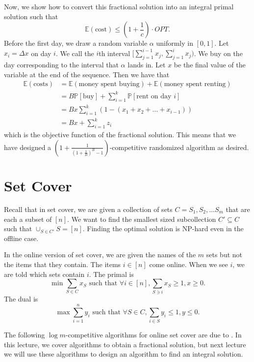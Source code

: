 \documentclass[11pt]{article}
\begin{document}
Now, we show how to convert this fractional solution into an integral primal solution such that
\[\mathbb{E}(\text{cost}) \le \left(1 + \frac{1}{c} \right) \cdot OPT.\]
Before the first day, we draw a random variable $\alpha$ uniformly in $[0,1]$. Let $x_i = \Delta x$ on day $i$. We call the $i$th interval $[\sum_{j=1}^{i-1} x_j, \sum_{j=1}^i x_j)$. We buy on the day corresponding to the interval that $\alpha$ lands in. Let $x$ be the final value of the variable at the end of the sequence.  Then we have that
\begin{align*}
\mathbb{E}(\text{costs}) &= \mathbb{E}(\text{money spent buying}) + \mathbb{E}(\text{money spent renting}) \\
&= B \mathbb{P}[\text{buy}] + \sum_{i=1}^k \mathbb{P}[\text{rent on day $i$}] \\
&= B x \sum_{i=1}^k (1 - (x_1 + x_2 + \ldots + x_{i-1})) \\
&= Bx + \sum_{i=1}^k z_i 
\end{align*}  
which is the objective function of the fractional solution. This means that we have designed a $\left(1 + \frac{1}{(1+\frac{1}{B})^B - 1}\right)$-competitive randomized algorithm as desired.
\section{Set Cover}
Recall that in set cover, we are given a collection of sets $C = S_1, S_2, \ldots S_m$ that are each a subset of $[n]$. We want to find the smallest sized subcollection $C' \subseteq C$ such that $\cup_{S \in C'} S = [n]$. Finding the optimal solution is NP-hard even in the offline case. 

In the online version of set cover, we are given the names of the $m$ sets but not the items that they contain. The items $i \in [n]$ come online. When we see $i$, we are told which sets contain $i$. The primal is
\[\min \sum_{S \in C} x_S \text{ such that } \forall i \in [n], \sum_{S \ni i} x_S \ge 1, x \ge 0.\] The dual is
\[\max \sum_{i=1}^n y_i \text{ such that } \forall S \in C, \sum_{i \in S} y_i \le 1, y \le 0.\] 

The following $\log m$-competitive algorithms for online set cover are due to \cite{setcover}. In this lecture, we cover algorithms to obtain a fractional solution, but next lecture we will use these algorithms to design an algorithm to find an integral solution. 
\end{document}
